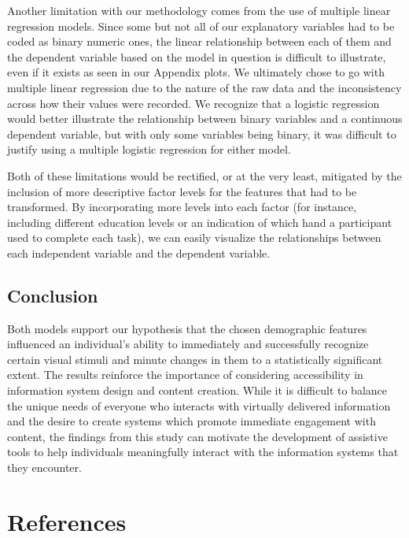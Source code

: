 \documentclass[
]{article}
\begin{document}
Another limitation with our methodology comes from the use of multiple
linear regression models. Since some but not all of our explanatory
variables had to be coded as binary numeric ones, the linear
relationship between each of them and the dependent variable based on
the model in question is difficult to illustrate, even if it exists as
seen in our Appendix plots. We ultimately chose to go with multiple
linear regression due to the nature of the raw data and the
inconsistency across how their values were recorded. We recognize that a
logistic regression would better illustrate the relationship between
binary variables and a continuous dependent variable, but with only some
variables being binary, it was difficult to justify using a multiple
logistic regression for either model.

Both of these limitations would be rectified, or at the very least,
mitigated by the inclusion of more descriptive factor levels for the
features that had to be transformed. By incorporating more levels into
each factor (for instance, including different education levels or an
indication of which hand a participant used to complete each task), we
can easily visualize the relationships between each independent variable
and the dependent variable.

\hypertarget{conclusion}{%
\subsection{Conclusion}\label{conclusion}}

Both models support our hypothesis that the chosen demographic features
influenced an individual's ability to immediately and successfully
recognize certain visual stimuli and minute changes in them to a
statistically significant extent. The results reinforce the importance
of considering accessibility in information system design and content
creation. While it is difficult to balance the unique needs of everyone
who interacts with virtually delivered information and the desire to
create systems which promote immediate engagement with content, the
findings from this study can motivate the development of assistive tools
to help individuals meaningfully interact with the information systems
that they encounter.

\hypertarget{references}{%
\section{References}\label{references}}
\end{document}
